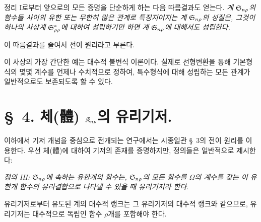 정리 I로부터 앞으로의 모든 증명을 단순하게 하는 다음 따름결과도 얻는다. \emph{계 $\mathfrak S_{n\rho}$의 함수들 사이의 유한 또는 무한히 많은 관계로 특징지어지는 계 $\mathfrak S_{n\rho}$의 성질은, 그것이 하나의 사상계 $\mathfrak S^*_{\rho\rho}$에 대하여 성립하기만 하면 계 $\mathfrak S_{n\rho}$에 대해서도 성립한다.}

이 따름결과를 줄여서 \glqq{}전이 원리\grqq{}라고 부른다.

이 사상의 가장 간단한 예는 대수적 불변식 이론이다. 실제로 선형변환을 통해 기본형식의 몇몇 계수를 언제나 수치적으로 정하여, 특수형식에 대해 성립하는 모든 관계가 일반적으로도 보존되도록 할 수 있다.

\section*{\S\ 4. 체(體) $\mathfrak K_{n\rho}$의 유리기저.}

이하에서 기저 개념을 중심으로 전개되는 연구에서는 시종일관 \S\ 3의 \glqq{}전이 원리\grqq{}를 이용한다. 우선 체(體)에 대하여 기저의 존재를 증명하지만, 정의들은 일반적으로 제시한다:

\emph{정의 III: $\mathfrak S_{n\rho}$에 속하는 유한개의 함수는, $\mathfrak S_{n\rho}$의 모든 함수를 $\Omega$의 계수를 갖는 이 유한개 함수의 유리결합으로 나타낼 수 있을 때 유리기저라 한다.}

유리기저로부터 유도된 계의 대수적 랭크는 그 유리기저의 대수적 랭크와 같으므로, 유리기저는 대수적으로 독립인 함수 $\rho$개를 포함해야 한다.

